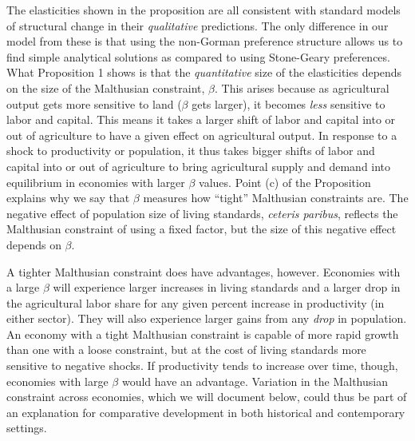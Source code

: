 \documentclass[11pt]{article}
\begin{document}
\vspace{.3cm} The elasticities shown in the proposition are all consistent with standard models of structural change \citep{kp2001,Gollin:2007oq,Restuccia:2008hc,Gollin:2010ys,vollrath2011,Alvarez-Cuadrado:2011nx,hrv2014,duarte2010role} in their \textit{qualitative} predictions. The only difference in our model from these is that using the non-Gorman preference structure allows us to find simple analytical solutions as compared to using Stone-Geary preferences. What Proposition 1 shows is that the \textit{quantitative} size of the elasticities depends on the size of the Malthusian constraint, $\beta$. This arises because as agricultural output gets more sensitive to land ($\beta$ gets larger), it becomes \textit{less} sensitive to labor and capital. This means it takes a larger shift of labor and capital into or out of agriculture to have a given effect on agricultural output. In response to a shock to productivity or population, it thus takes bigger shifts of labor and capital into or out of agriculture to bring agricultural supply and demand into equilibrium in economies with larger $\beta$ values. Point (c) of the Proposition explains why we say that $\beta$ measures how ``tight'' Malthusian constraints are. The negative effect of population size of living standards, \textit{ceteris paribus}, reflects the Malthusian constraint of using a fixed factor, but the size of this negative effect depends on $\beta$. 

A tighter Malthusian constraint does have advantages, however. Economies with a large $\beta$ will experience larger increases in living standards and a larger drop in the agricultural labor share for any given percent increase in productivity (in either sector). They will also experience larger gains from any \textit{drop} in population. An economy with a tight Malthusian constraint is capable of more rapid growth than one with a loose constraint, but at the cost of living standards more sensitive to negative shocks. If productivity tends to increase over time, though, economies with large $\beta$ would have an advantage. Variation in the Malthusian constraint across economies, which we will document below, could thus be part of an explanation for comparative development in both historical and contemporary settings.
\end{document}
